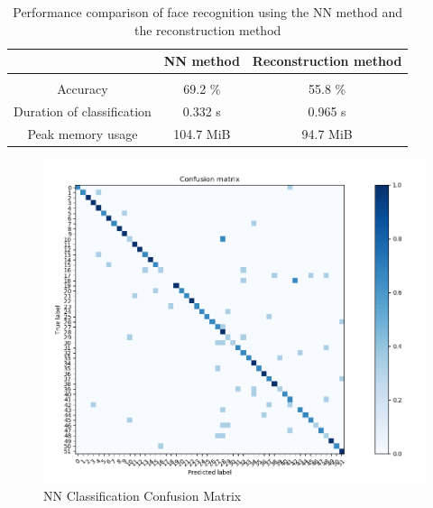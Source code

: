 \documentclass[10pt,technote]{IEEEtran}
\begin{document}
\begin{table}[]
    \centering
    \begin{tabular}{c||c c}
         & NN method & Reconstruction method  \\\hline \hline\\
         Accuracy &  69.2 \% & 55.8 \% \\
         Duration of classification & 0.332 s & 0.965 s \\
         Peak memory usage & 104.7 MiB & 94.7 MiB
         
    \end{tabular}
    \caption{Performance comparison of face recognition using the NN method and the reconstruction method}
    \label{tab:NNvsRec}
\end{table}



\begin{figure}[htb!]
    \centering
    \includegraphics[width=\linewidth]{../results/1bb/confusion_NN.png}
    \caption{NN Classification Confusion Matrix}
    \label{fig:NN_conf_mat}
\end{figure}
\end{document}

